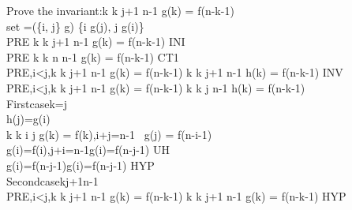 \documentclass[11pt,a4paper,fleqn]{article}
\begin{document}
\noindent
Prove the invariant:\forall k \cdot k \in j+1 \upto n-1 \Rightarrow g(k) = f(n-k-1) \\
set\; =(\{i, j\} \domsub g) \cup\{i \mapsto g(j), j \mapsto g(i)\} \\
PRE \vdash [j:=n-1]\forall k \cdot k \in j+1 \upto n-1 \Rightarrow g(k) = f(n-k-1) \;INI \\
PRE \vdash \forall k \cdot k \in n \upto n-1 \Rightarrow g(k) = f(n-k-1) \;CT1 \\
PRE,i<j,\forall k \cdot k \in j+1 \upto n-1 \Rightarrow g(k) = f(n-k-1) \vdash [j:=j-1,g:=h]\forall k \cdot k \in j+1 \upto n-1 \Rightarrow h(k) = f(n-k-1) \;INV \\
PRE,i<j,\forall k \cdot k \in j+1 \upto n-1 \Rightarrow g(k) = f(n-k-1) \vdash \forall k \cdot k \in j \upto n-1 \Rightarrow h(k) = f(n-k-1)  \\
First\;case\;k=j\\
h(j)=g(i) \\
\forall k \cdot k \in i \upto j \Rightarrow g(k) = f(k),i+j=n-1 \vdash \ g(j) = f(n-i-1) \\
g(i)=f(i),j+i=n-1\vdash g(i)=f(n-j-1) \;UH \\
g(i)=f(n-j-1)\vdash g(i)=f(n-j-1) \; HYP \\
Second\;case\;k\in j+1\upto n-1 \\
PRE,i<j,\forall k \cdot k \in j+1 \upto n-1 \Rightarrow g(k) = f(n-k-1) \vdash \forall k \cdot k \in j+1 \upto n-1 \Rightarrow g(k) = f(n-k-1) \;HYP\\
\end{document}
